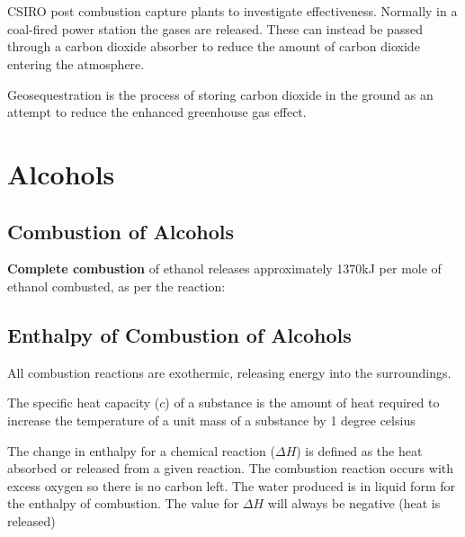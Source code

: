 			\begin{center}
				 \\
				 \\
			\end{center}
			
			CSIRO post combustion capture plants to investigate effectiveness. Normally in a coal-fired power station the gases are released. These can instead be passed through a carbon dioxide absorber to reduce the amount of carbon dioxide entering the atmosphere.

			Geosequestration is the process of storing carbon dioxide in the ground as an attempt to reduce the enhanced greenhouse gas effect.

\section{Alcohols}

	\subsection{Combustion of Alcohols}
	
		\textbf{Complete combustion} of ethanol releases approximately 1370kJ per mole of ethanol combusted, as per the reaction:

			\begin{center}
			\end{center}

	\subsection{Enthalpy of Combustion of Alcohols}
	
		All combustion reactions are exothermic, releasing energy into the surroundings.

		The specific heat capacity ($c$) of a substance is the amount of heat required to increase the temperature of a unit mass of a substance by 1 degree celsius

		The change in enthalpy for a chemical reaction ($\Delta H$) is defined as the heat absorbed or released from a given reaction. The combustion reaction occurs with excess oxygen so there is no carbon left. The water produced is in liquid form for the enthalpy of combustion. The value for $\Delta H$ will always be negative (heat is released)

